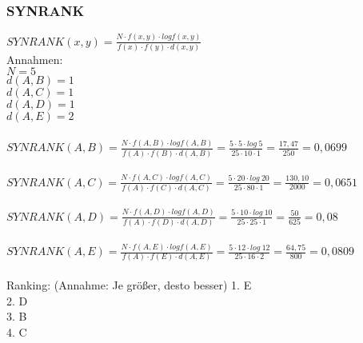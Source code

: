 \subsubsection*{SYNRANK}
$SYNRANK(x,y) = \frac{N \cdot f(x, y) \cdot log f(x,y)}{f(x) \cdot f(y) \cdot d(x, y)} $\\
Annahmen:\\
$N = 5$\\
$d(A,B) = 1$\\
$d(A,C) = 1$\\
$d(A,D) = 1$\\
$d(A,E) = 2$\\
\ \\
$SYNRANK(A,B) = \frac{N \cdot f(A, B) \cdot log f(A,B)}{f(A) \cdot f(B) \cdot d(A, B)} = \frac{5 \cdot 5 \cdot log\ 5}{25 \cdot 10 \cdot 1} =  \frac{17,47}{250} = 0,0699$\\
\ \\
$SYNRANK(A,C) = \frac{N \cdot f(A, C) \cdot log f(A,C)}{f(A) \cdot f(C) \cdot d(A, C)} = \frac{5 \cdot 20 \cdot log\ 20}{25 \cdot 80 \cdot 1} = \frac{130,10}{2000} = 0,0651 $\\
\ \\
$SYNRANK(A,D) = \frac{N \cdot f(A, D) \cdot log f(A,D)}{f(A) \cdot f(D) \cdot d(A, D)} = \frac{5 \cdot 10 \cdot log\ 10}{25 \cdot 25 \cdot 1} = \frac{50}{625} = 0,08 $\\
\ \\
$SYNRANK(A,E) = \frac{N \cdot f(A, E) \cdot log f(A,E)}{f(A) \cdot f(E) \cdot d(A, E)} = \frac{5 \cdot 12 \cdot log\ 12}{25 \cdot 16 \cdot 2} = \frac{64,75}{800} = 0,0809$\\
\ \\
Ranking: (Annahme: Je größer, desto besser)
1. E\\
2. D\\
3. B\\
4. C\\


